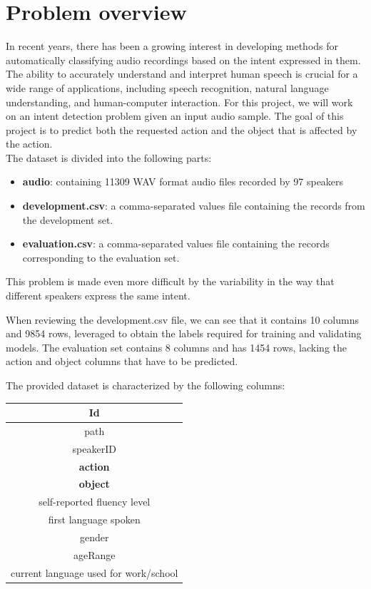 \documentclass[conference]{IEEEtran}
\begin{document}
\section{Problem overview}
In recent years, there has been a growing interest in developing methods for automatically classifying audio recordings based on the intent expressed in them. The ability to accurately understand and interpret human speech is crucial for a wide range of applications, including speech recognition, natural language understanding, and human-computer interaction.
For this project, we will work on an intent detection problem given an input audio sample. The goal of this project is to predict both the requested action and the object that is affected by the action.\\
The dataset is divided into the following parts:
\begin{itemize}
 \item 	\textbf{audio}: containing 11309 WAV format audio files recorded by 97 speakers
 \item 	\textbf{development.csv}: a comma-separated values file containing the records from the development set.
 \item 	 \textbf{evaluation.csv}: a comma-separated values file containing the records corresponding to the evaluation set.
\end{itemize}
This problem is made even more difficult by the variability in the way that different speakers express the same intent.

When reviewing the development.csv file, we can see that it contains 10 columns and 9854 rows, leveraged to obtain the labels required for training and validating models. The evaluation set contains 8 columns and has 1454 rows, lacking the action and object columns that have to be predicted.\\

\vspace{20mm}

The provided dataset is characterized by the following columns:


\begin{center}
\begin{tabular}{ |c| } 

 \hline
 Id   \\ 
  \hline
 path  \\
  \hline
 speakerID\\
  \hline
 \textbf{action}\\
  \hline
 \textbf{object}   \\
  \hline
 self-reported fluency level  \\ 
 \hline
 first language spoken \\
 \hline
 gender\\ 
 \hline
 ageRange   \\ 
 \hline
 current language used for work/school   \\ 
 \hline

\end{tabular}
\end{center}
\end{document}
